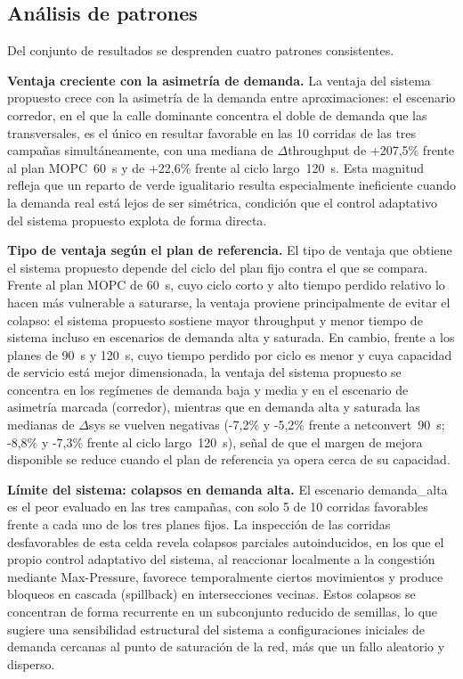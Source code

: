 \subsection{Análisis de patrones}
\label{subsec:control_patrones}

Del conjunto de resultados se desprenden cuatro patrones consistentes.

\textbf{Ventaja creciente con la asimetría de demanda.} La ventaja del sistema propuesto
crece con la asimetría de la demanda entre aproximaciones: el escenario corredor, en el
que la calle dominante concentra el doble de demanda que las transversales, es el único
en resultar favorable en las 10 corridas de las tres campañas simultáneamente, con una
mediana de $\Delta$throughput de +207,5\% frente al plan MOPC~60~s y de +22,6\% frente al
ciclo largo~120~s. Esta magnitud refleja que un reparto de verde igualitario resulta
especialmente ineficiente cuando la demanda real está lejos de ser simétrica, condición
que el control adaptativo del sistema propuesto explota de forma directa.

\textbf{Tipo de ventaja según el plan de referencia.} El tipo de ventaja que obtiene el
sistema propuesto depende del ciclo del plan fijo contra el que se compara. Frente al
plan MOPC de 60~s, cuyo ciclo corto y alto tiempo perdido relativo lo hacen más
vulnerable a saturarse, la ventaja proviene principalmente de evitar el colapso: el
sistema propuesto sostiene mayor throughput y menor tiempo de sistema incluso en
escenarios de demanda alta y saturada. En cambio, frente a los planes de 90~s y 120~s,
cuyo tiempo perdido por ciclo es menor y cuya capacidad de servicio está mejor
dimensionada, la ventaja del sistema propuesto se concentra en los regímenes de demanda
baja y media y en el escenario de asimetría marcada (corredor), mientras que en demanda
alta y saturada las medianas de $\Delta$sys se vuelven negativas (-7,2\% y -5,2\% frente a
netconvert~90~s; -8,8\% y -7,3\% frente al ciclo largo~120~s), señal de que el margen de
mejora disponible se reduce cuando el plan de referencia ya opera cerca de su capacidad.

\textbf{Límite del sistema: colapsos en demanda alta.} El escenario demanda\_alta es el
peor evaluado en las tres campañas, con solo 5 de 10 corridas favorables frente a cada uno
de los tres planes fijos. La inspección de las corridas desfavorables de esta celda
revela colapsos parciales autoinducidos, en los que el propio control adaptativo del
sistema, al reaccionar localmente a la congestión mediante Max-Pressure, favorece
temporalmente ciertos movimientos y produce bloqueos en cascada (spillback) en
intersecciones vecinas. Estos colapsos se concentran de forma recurrente en un subconjunto
reducido de semillas, lo que sugiere una sensibilidad estructural del sistema a
configuraciones iniciales de demanda cercanas al punto de saturación de la red, más que un
fallo aleatorio y disperso.

